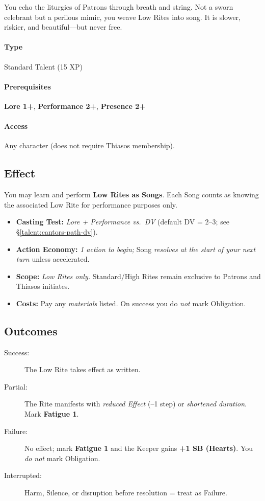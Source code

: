\begin{tcolorbox}[colback=black!3,colframe=black!40!white,title={Cantor's Path}]
You echo the liturgies of Patrons through breath and string. Not a sworn celebrant but a perilous mimic, you weave Low Rites into song. It is slower, riskier, and beautiful---but never free.
\end{tcolorbox}

\paragraph*{Type} Standard Talent (15 XP) \quad
\paragraph*{Prerequisites} \textbf{Lore 1+}, \textbf{Performance 2+}, \textbf{Presence 2+} \quad
\paragraph*{Access} Any character (does not require Thiasos membership).

\subsection*{Effect}
You may learn and perform \textbf{Low Rites as Songs}. Each Song counts as knowing the associated Low Rite for performance purposes only.

\begin{itemize}
\item \textbf{Casting Test:} \emph{Lore + Performance vs.\ DV} (default DV = 2--3; see \S\ref{talent:cantors-path-dv}).
\item \textbf{Action Economy:} \emph{1 action to begin;} Song \emph{resolves at the start of your next turn} unless accelerated.
\item \textbf{Scope:} \emph{Low Rites only.} Standard/High Rites remain exclusive to Patrons and Thiasos initiates.
\item \textbf{Costs:} Pay any \emph{materials} listed. On success you do \emph{not} mark Obligation.
\end{itemize}

\subsection*{Outcomes}
\begin{description}
\item[Success:] The Low Rite takes effect as written.
\item[Partial:] The Rite manifests with \emph{reduced Effect} (–1 step) or \emph{shortened duration}. Mark \textbf{Fatigue 1}.
\item[Failure:] No effect; mark \textbf{Fatigue 1} and the Keeper gains \textbf{+1 SB (Hearts)}. You \emph{do not} mark Obligation.
\item[Interrupted:] Harm, Silence, or disruption before resolution = treat as Failure.
\end{description}

